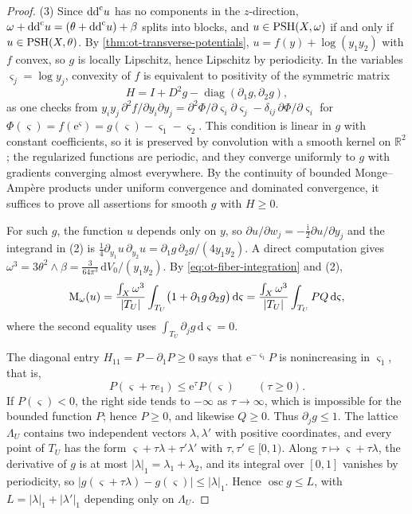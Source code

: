 \begin{proof}
(3) Since $\mathrm{dd}^{\mathrm{c}} u$ has no components in the $z$-direction, $\omega+\mathrm{dd}^{\mathrm{c}} u=(\theta+\mathrm{dd}^{\mathrm{c}} u)+\beta$ splits into blocks, and $u\in\mathrm{PSH}(X,\omega)$ if and only if $u\in\mathrm{PSH}(X,\theta)$. By \cref{thm:ot-transverse-potentials}, $u=f(y)+\log(y_1y_2)$ with $f$ convex, so $g$ is locally Lipschitz, hence Lipschitz by periodicity. In the variables $\varsigma_j=\log y_j$, convexity of $f$ is equivalent to positivity of the symmetric matrix
\[
 H=I+D^2g-\operatorname{diag}(\partial_1g,\partial_2g),
\]
as one checks from $y_iy_j\,\partial^2f/\partial y_i\partial y_j=\partial^2\Phi/\partial\varsigma_i\partial\varsigma_j-\delta_{ij}\,\partial\Phi/\partial\varsigma_i$ for $\Phi(\varsigma)=f(\mathrm e^{\varsigma})=g(\varsigma)-\varsigma_1-\varsigma_2$. This condition is linear in $g$ with constant coefficients, so it is preserved by convolution with a smooth kernel on $\mathbb R^2$; the regularized functions are periodic, and they converge uniformly to $g$ with gradients converging almost everywhere. By the continuity of bounded Monge--Amp\`ere products under uniform convergence and dominated convergence, it suffices to prove all assertions for smooth $g$ with $H\geq0$.

For such $g$, the function $u$ depends only on $y$, so $\partial u/\partial w_j=-\frac{\mathrm i}2\partial u/\partial y_j$ and the integrand in (2) is $\frac14\partial_{y_1}u\,\partial_{y_2}u=\partial_1g\,\partial_2g/(4y_1y_2)$. A direct computation gives $\omega^3=3\theta^2\wedge\beta=\frac{3}{64\pi^3}\,\mathrm dV_0/(y_1y_2)$. By \eqref{eq:ot-fiber-integration} and (2),
\[
 \mathrm M_\omega(u)=\frac{\int_X\omega^3}{|T_U|}\int_{T_U}
       \bigl(1+\partial_1g\,\partial_2g\bigr)\,\mathrm d\varsigma
 =\frac{\int_X\omega^3}{|T_U|}\int_{T_U}PQ\,\mathrm d\varsigma,
\]
where the second equality uses $\int_{T_U}\partial_jg\,\mathrm d\varsigma=0$.

The diagonal entry $H_{11}=P-\partial_1P\geq0$ says that $\mathrm e^{-\varsigma_1}P$ is nonincreasing in $\varsigma_1$, that is,
\begin{equation}\label{eq:ot-p-monotone}
 P(\varsigma+\tau e_1)\leq\mathrm e^{\tau}P(\varsigma)\qquad(\tau\geq0).
\end{equation}
If $P(\varsigma)<0$, the right side tends to $-\infty$ as $\tau\to\infty$, which is impossible for the bounded function $P$; hence $P\geq0$, and likewise $Q\geq0$. Thus $\partial_jg\leq1$. The lattice $\Lambda_U$ contains two independent vectors $\lambda,\lambda'$ with positive coordinates, and every point of $T_U$ has the form $\varsigma+\tau\lambda+\tau'\lambda'$ with $\tau,\tau'\in[0,1)$. Along $\tau\mapsto\varsigma+\tau\lambda$, the derivative of $g$ is at most $|\lambda|_1=\lambda_1+\lambda_2$, and its integral over $[0,1]$ vanishes by periodicity, so $|g(\varsigma+\tau\lambda)-g(\varsigma)|\leq|\lambda|_1$. Hence $\operatorname{osc}g\leq L$, with $L=|\lambda|_1+|\lambda'|_1$ depending only on $\Lambda_U$.


\end{proof}
